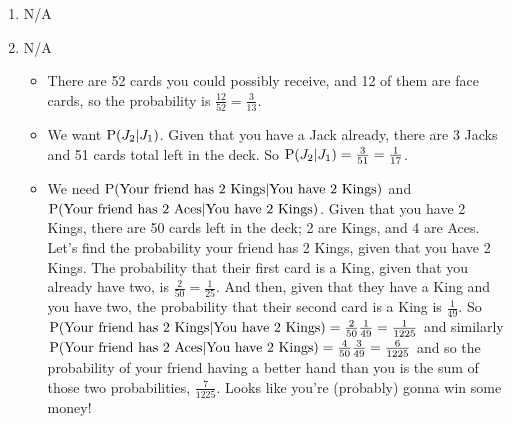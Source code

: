 \documentclass[12pt]{article}
\newcommand{\Pp}{\emph{\emph{P}}}
\begin{document}
\begin{enumerate}
	\item N/A
	\item N/A
	\begin{itemize}
		\item There are 52 cards you could possibly receive, and 12 of them are face cards, so the probability is $\frac{12}{52} = \frac{3}{13}$.
		\item We want $\Pp(J_2 | J_1)$. Given that you have a Jack already, there are 3 Jacks and 51 cards total left in the deck. So $\Pp(J_2 | J_1) = \frac{3}{51} = \frac{1}{17}$.
		\item We need $\Pp(\text{Your friend has 2 Kings} | \text{You have 2 Kings})$ and \\ $\Pp(\text{Your friend has 2 Aces} | \text{You have 2 Kings})$. Given that you have 2 Kings, there are 50 cards left in the deck; 2 are Kings, and 4 are Aces. Let's find the probability your friend has 2 Kings, given that you have 2 Kings. The probability that their first card is a King, given that you already have two, is $\frac{2}{50} = \frac{1}{25}$. And then, given that they have a King and you have two, the probability that their second card is a King is $\frac{1}{49}$. So $\Pp(\text{Your friend has 2 Kings} | \text{You have 2 Kings}) = \frac{2}{50} \frac{1}{49} = \frac{1}{1225}$ and similarly $\Pp(\text{Your friend has 2 Aces} | \text{You have 2 Kings}) = \frac{4}{50} \frac{3}{49} = \frac{6}{1225}$ and so the probability of your friend having a better hand than you is the sum of those two probabilities, $\frac{7}{1225}$. Looks like you're (probably) gonna win some money!
	\end{itemize}
\end{enumerate}
\end{document}
